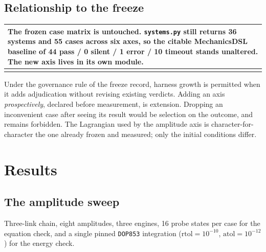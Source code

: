 \documentclass[11pt,a4paper]{article}
\makeatletter
\newenvironment{callout}
  {\par\medskip\noindent\begin{tabular}{@{}p{0.94\textwidth}@{}}
   \arrayrulecolor{warnrule}\hline\rule{0pt}{2.6ex}}
  {\\[0.8ex]\hline\arrayrulecolor{black}\end{tabular}\par\medskip}
\makeatother
\begin{document}
\subsection{Relationship to the freeze}

\begin{callout}
\textbf{The frozen case matrix is untouched.} \texttt{systems.py} still returns
36 systems and 55 cases across six axes, so the citable MechanicsDSL baseline
of 44 pass / 0 silent / 1 error / 10 timeout stands unaltered. The new axis
lives in its own module.
\end{callout}

\noindent Under the governance rule of the freeze record, harness growth is
permitted when it adds adjudication without revising existing verdicts. Adding
an axis \emph{prospectively}, declared before measurement, is extension.
Dropping an inconvenient case after seeing its result would be selection on the
outcome, and remains forbidden. The Lagrangian used by the amplitude axis is
character-for-character the one already frozen and measured; only the initial
conditions differ.

\section{Results}

\subsection{The amplitude sweep}

Three-link chain, eight amplitudes, three engines, 16 probe states per case for
the equation check, and a single pinned \texttt{DOP853} integration
($\mathrm{rtol}=10^{-10}$, $\mathrm{atol}=10^{-12}$) for the energy check.
\end{document}
